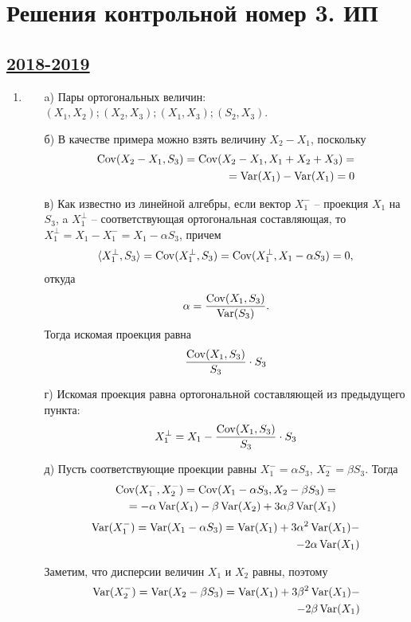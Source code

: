 \thispagestyle{empty}
\section{Решения контрольной номер 3. ИП}




\subsection[2018-2019]{\hyperref[sec:kr_03_ip_2018_2019]{2018-2019}}
\label{sec:sol_kr_03_ip_2018_2019}

\begin{enumerate}
\item
\begin{enumerate}
\item[a)] Пары ортогональных величин: $(X_1,X_2);(X_2,X_3);(X_1,X_3);(S_2,X_3)$.
\item[б)] В качестве примера можно взять величину $X_2-X_1$, поскольку 
\begin{align*}\operatorname{Cov}(X_2-X_1,S_3)=\operatorname{Cov}(X_2-X_1,X_1+X_2+X_3)=\\=\operatorname{Var}(X_1)-\operatorname{Var}(X_1)=0\end{align*}
\item[в)] Как известно из линейной алгебры, если вектор $X^-_1$ – проекция $X_1$ на $S_3$, a $X^{\perp}_1$ – соответствующая ортогональная составляющая, то $X^{\perp}_1=X_1-X^-_1=X_1-\alpha S_3$, причем 
\[\langle X^{\perp}_1,S_3\rangle=\operatorname{Cov}(X^{\perp}_1,S_3)=\operatorname{Cov}(X^{\perp}_1,X_1-\alpha S_3)=0,\] 
откуда 
\[\alpha=\frac{\operatorname{Cov}(X_1,S_3)}{\operatorname{Var}(S_3)}.\]
Тогда искомая проекция равна 
\[\frac{\operatorname{Cov}(X_1,S_3)}{S_3}\cdot S_3\]
\item[г)] Искомая проекция равна ортогональной составляющей из предыдущего пункта:
\[X^{\perp}_1=X_1-\frac{\operatorname{Cov}(X_1,S_3)}{S_3}\cdot S_3\]
\item[д)] Пусть соответствующие проекции равны $X^-_1=\alpha S_3$, $X^-_2=\beta S_3$. Тогда 
\begin{align*}\operatorname{Cov}(X^-_1,X^-_2)=\operatorname{Cov}(X_1-\alpha S_3,X_2 - \beta S_3)=\\=-\alpha\operatorname{Var}(X_1)-\beta\operatorname{Var}(X_2)+3\alpha\beta\operatorname{Var}(X_1)
\end{align*}
\begin{align*}\operatorname{Var}(X^-_1)=\operatorname{Var}(X_1-\alpha S_3)=\operatorname{Var}(X_1)+3\alpha^2\operatorname{Var}(X_1)-\\-2\alpha\operatorname{Var}(X_1)\end{align*}

Заметим, что дисперсии величин $X_1$ и $X_2$ равны, поэтому
\begin{align*}\operatorname{Var}(X^-_2)=\operatorname{Var}(X_2-\beta S_3)=\operatorname{Var}(X_1)+3\beta^2\operatorname{Var}(X_1)-\\-2\beta\operatorname{Var}(X_1)\end{align*}


\end{enumerate}
\end{enumerate}
